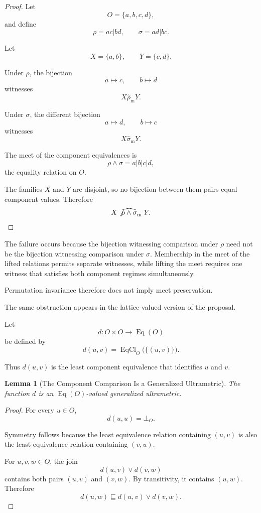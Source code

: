 \documentclass[11pt]{article}
\theoremstyle{plain}
\newtheorem{lemma}[theorem]{Lemma}
\theoremstyle{definition}
\theoremstyle{remark}
\begin{document}
\begin{proof}
  Let
  \[
    O
    =
    \{a,b,c,d\},
  \]
  and define
  \[
    \rho
    =
    ac|bd,
    \qquad
    \sigma
    =
    ad|bc.
  \]

  Let
  \[
    X
    =
    \{a,b\},
    \qquad
    Y
    =
    \{c,d\}.
  \]

  Under \(\rho\),
  the bijection
  \[
    a\longmapsto c,
    \qquad
    b\longmapsto d
  \]
  witnesses
  \[
    X
    \mathrel{\widehat{\rho}_{\mathrm{m}}}
    Y.
  \]

  Under \(\sigma\),
  the different bijection
  \[
    a\longmapsto d,
    \qquad
    b\longmapsto c
  \]
  witnesses
  \[
    X
    \mathrel{\widehat{\sigma}_{\mathrm{m}}}
    Y.
  \]

  The meet of the component equivalences is
  \[
    \rho\wedge\sigma
    =
    a|b|c|d,
  \]
  the equality relation on \(O\).

  The families \(X\) and \(Y\) are disjoint,
  so no bijection between them
  pairs equal component values.
  Therefore
  \[
    X
    \mathrel{\not\widehat{
        \rho\wedge\sigma
      }_{\mathrm{m}}}
    Y.
  \]
\end{proof}

The failure occurs because
the bijection witnessing comparison under \(\rho\)
need not be the bijection witnessing comparison under \(\sigma\).
Membership in the meet of the lifted relations
permits separate witnesses,
while lifting the meet requires one witness
that satisfies both component regimes simultaneously.

Permutation invariance therefore does not imply
meet preservation.

The same obstruction appears
in the lattice-valued version of the proposal.

Let
\[
  d:
  O\times O
  \longrightarrow
  \operatorname{Eq}(O)
\]
be defined by
\[
  d(u,v)
  =
  \operatorname{EqCl}_{O}
  \bigl(
  \{
  (u,v)
  \}
  \bigr).
\]

Thus \(d(u,v)\)
is the least component equivalence
that identifies \(u\) and \(v\).

\begin{lemma}[The Component Comparison Is a Generalized Ultrametric]
  \label{ik.lem.component-ultrametric}
  The function \(d\)
  is an
  \(\operatorname{Eq}(O)\)-valued
  generalized ultrametric.
\end{lemma}

\begin{proof}
  For every \(u\in O\),
  \[
    d(u,u)
    =
    \bot_O.
  \]

  Symmetry follows because
  the least equivalence relation containing
  \((u,v)\)
  is also the least equivalence relation containing
  \((v,u)\).

  For \(u,v,w\in O\),
  the join
  \[
    d(u,v)
    \vee
    d(v,w)
  \]
  contains both pairs
  \((u,v)\) and \((v,w)\).
  By transitivity,
  it contains \((u,w)\).
  Therefore
  \[
    d(u,w)
    \sqsubseteq
    d(u,v)
    \vee
    d(v,w).
  \]
\end{proof}
\end{document}
